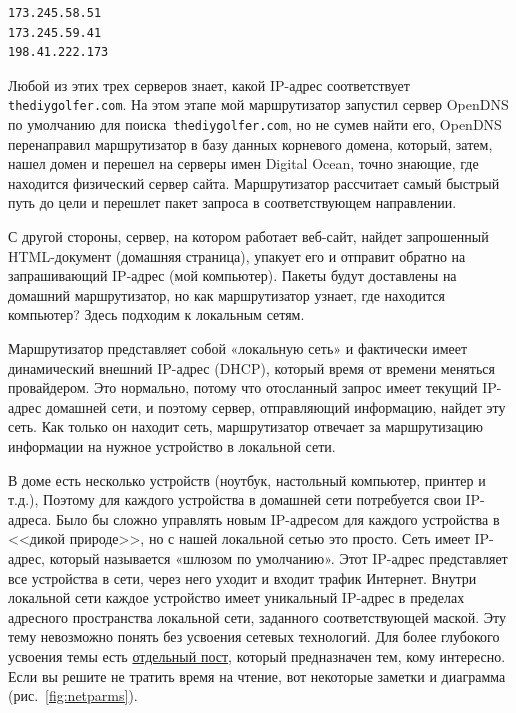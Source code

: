\documentclass[12pt]{article}
\begin{document}
\begin{verbatim}
173.245.58.51
173.245.59.41
198.41.222.173
\end{verbatim}

Любой из этих трех серверов знает, какой IP-адрес соответствует
\texttt{thediygolfer.com}. На этом этапе мой маршрутизатор запустил
сервер OpenDNS по умолчанию для поиска\texttt{\ thediygolfer.com}, но не
сумев найти его, OpenDNS перенаправил маршрутизатор в базу данных
корневого домена, который, затем, нашел домен и перешел на серверы имен
Digital Ocean, точно знающие, где находится физический сервер сайта.
Маршрутизатор рассчитает самый быстрый путь до цели и перешлет пакет
запроса в соответствующем направлении.

С другой стороны, сервер, на котором работает веб-сайт, найдет
запрошенный HTML-документ (домашняя страница), упакует его и отправит
обратно на запрашивающий IP-адрес (мой компьютер). Пакеты будут
доставлены на домашний маршрутизатор, но как маршрутизатор узнает, где
находится компьютер? Здесь подходим к локальным сетям.

Маршрутизатор представляет собой «локальную сеть» и фактически имеет
динамический внешний IP-адрес (DHCP), который время от времени меняться
провайдером. Это нормально, потому что отосланный запрос имеет текущий
IP-адрес домашней сети, и поэтому сервер, отправляющий информацию,
найдет эту сеть. Как только он находит сеть, маршрутизатор отвечает за
маршрутизацию информации на нужное устройство в локальной сети.

В доме есть несколько устройств (ноутбук, настольный компьютер, принтер
и т.д.), Поэтому для каждого устройства в домашней сети потребуется свои
IP-адреса. Было бы сложно управлять новым IP-адресом для каждого
устройства в <<дикой природе>>, но с нашей локальной сетью это просто.
Сеть имеет IP-адрес, который называется «шлюзом по умолчанию». Этот
IP-адрес представляет все устройства в сети, через него уходит и входит
трафик Интернет. Внутри локальной сети каждое устройство имеет
уникальный IP-адрес в пределах адресного пространства локальной сети,
заданного соответствующей маской. Эту тему невозможно понять без
усвоения сетевых технологий. Для более глубокого усвоения темы есть
\href{blog/2019/ip-addresses-netmasks}{отдельный пост}, который
предназначен тем, кому интересно. Если вы решите не тратить время на
чтение, вот некоторые заметки и диаграмма (рис.~\ref{fig:netparms}).
\end{document}

